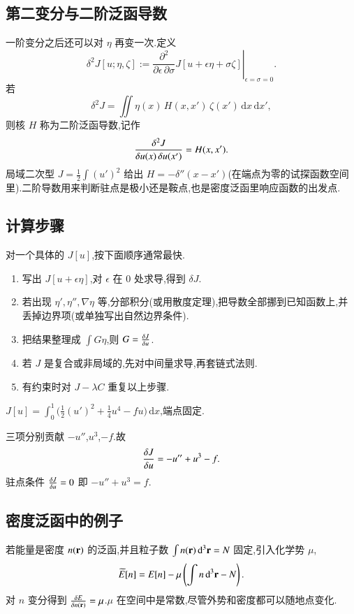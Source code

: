 \subsection{第二变分与二阶泛函导数}
一阶变分之后还可以对 $\eta$ 再变一次.定义
\begin{equation}
  \delta^2 J[u;\eta,\zeta]
  :=\left.\frac{\partial^2}{\partial\epsilon\,\partial\sigma}
    J[u+\epsilon\eta+\sigma\zeta]\right|_{\epsilon=\sigma=0}.
\end{equation}
若
\begin{equation}
  \delta^2 J=\iint\eta(x)\,H(x,x')\,\zeta(x')\,\mathrm{d}x\,\mathrm{d}x',
\end{equation}
则核 $H$ 称为二阶泛函导数,记作
\begin{equation}
  \frac{\delta {^2 J}}{\delta {u(x)\,\delta u(x')}}=H(x,x').
\end{equation}
局域二次型 $J=\frac12\int(u')^2$ 给出 $H=-\delta''(x-x')$(在端点为零的试探函数空间里).二阶导数用来判断驻点是极小还是鞍点,也是密度泛函里响应函数的出发点.

\subsection{计算步骤}
对一个具体的 $J[u]$,按下面顺序通常最快.
\begin{enumerate}
  \item 写出 $J[u+\epsilon\eta]$,对 $\epsilon$ 在 $0$ 处求导,得到 $\delta J$.
  \item 若出现 $\eta',\eta'',\nabla\eta$ 等,分部积分(或用散度定理),把导数全部挪到已知函数上,并丢掉边界项(或单独写出自然边界条件).
  \item 把结果整理成 $\int G\eta$,则 $G=\frac{\delta {J}}{\delta {u}}$.
  \item 若 $J$ 是复合或非局域的,先对中间量求导,再套链式法则.
  \item 有约束时对 $J-\lambda C$ 重复以上步骤.
\end{enumerate}

\begin{example}
$J[u]=\int_0^1\bigl(\frac12(u')^2+\frac14 u^4-fu\bigr)\,\mathrm{d}x$,端点固定.
\end{example}
\begin{solution}
三项分别贡献 $-u''$,$u^3$,$-f$.故
\begin{equation}
  \frac{\delta {J}}{\delta {u}}=-u''+u^3-f.
\end{equation}
驻点条件 $\frac{\delta {J}}{\delta {u}}=0$ 即 $-u''+u^3=f$.
\end{solution}

\subsection{密度泛函中的例子}
若能量是密度 $n({\mathbf{r}})$ 的泛函,并且粒子数 $\int n({\mathbf{r}})\,\mathrm{d}^3{\mathbf{r}}=N$ 固定,引入化学势 $\mu$,
\begin{equation}
  \widetilde E[n] = E[n] - \mu\left(\int n\,\mathrm{d}^3{\mathbf{r}} - N\right).
\end{equation}
对 $n$ 变分得到 $\frac{\delta {E}}{\delta {n({\mathbf{r}})}}=\mu$.$\mu$ 在空间中是常数,尽管外势和密度都可以随地点变化.


